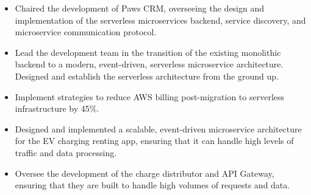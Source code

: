 \documentclass[10pt,a4paper,ragged2e]{classes/altacv}
\begin{document}
\tagline{ }

\begin{fullwidth}
\makecvheader
\end{fullwidth}




\begin{itemize}
\end{itemize}
\begin{itemize}
\item Chaired the development of Paws CRM, overseeing the design and implementation of the serverless microservices backend, service discovery, and microservice communication protocol.
\item Lead the development team in the transition of the existing monolithic backend to a modern, event-driven, serverless microservice architecture. Designed and establish the serverless architecture from the ground up.
\item Implement strategies to reduce AWS billing post-migration to serverless infrastructure by 45\%.

\end{itemize}

\divider

\begin{itemize}
\item Designed and implemented a scalable, event-driven microservice architecture for the EV charging renting app, ensuring that it can handle high levels of traffic and data processing.
\item Oversee the development of the charge distributor and API Gateway, ensuring that they are built to handle high volumes of requests and data.
\end{itemize}

\end{document}
